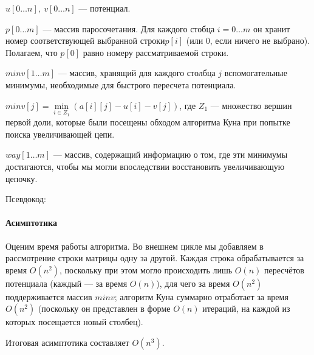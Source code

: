 \documentclass[a4paper,12pt]{article}
\begin{document}
$u[0 \dots n],\ v[0 \dots n]$ — потенциал.

$p[0 \dots m]$ — массив паросочетания. Для каждого стобца $i = 0 \dots m$ он хранит номер соответствующей выбранной строки$p[i]$ (или 0, если ничего не выбрано). Полагаем, что $p[0]$ равно номеру рассматриваемой строки.

$minv[1 \dots m]$ — массив, хранящий для каждого столбца $j$ вспомогательные минимумы, необходимые для быстрого пересчета потенциала.

$minv[j] = \min\limits_{i \in Z_1}(a[i][j] - u[i] - v[j])$, где $Z_1$ — множество вершин первой доли, которые были посещены обходом алгоритма Куна при попытке поиска увеличивающей цепи.

$way[1 \dots m]$ — массив, содержащий информацию о том, где эти минимумы достигаются, чтобы мы могли впоследствии восстановить увеличивающую цепочку.

Псевдокод:

\paragraph{Асимптотика}
Оценим время работы алгоритма. Во внешнем цикле мы добавляем в рассмотрение строки матрицы одну за другой. Каждая строка обрабатывается за время $O(n^2)$, поскольку при этом могло происходить лишь $O(n)$ пересчётов потенциала (каждый — за время $O(n)$), для чего за время $O(n^2)$ поддерживается массив $minv$; алгоритм Куна суммарно отработает за время $O(n^2)$ (поскольку он представлен в форме $O(n)$ итераций, на каждой из которых посещается новый столбец).

Итоговая асимптотика составляет $O(n^3)$.

\newpage
\end{document}
